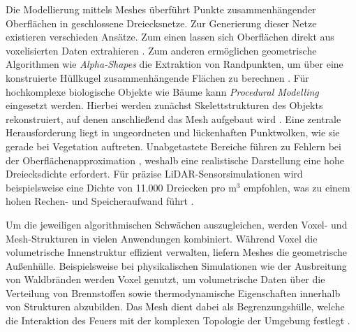 Die Modellierung mittels Meshes überführt Punkte zusammenhängender Oberflächen in geschlossene Dreiecksnetze. Zur Generierung dieser Netze existieren verschieden Ansätze. Zum einen lassen sich Oberflächen direkt aus voxelisierten Daten extrahieren \cite{chengRealTimeLiDARInertial2024}. Zum anderen ermöglichen geometrische Algorithmen wie \textit{Alpha-Shapes} die Extraktion von Randpunkten, um über eine konstruierte Hüllkugel zusammenhängende Flächen zu berechnen \cite{wangAutomatedPhenotypicTrait2024}. Für hochkomplexe biologische Objekte wie Bäume kann \textit{Procedural Modelling} eingesetzt werden. Hierbei werden zunächst Skelettstrukturen des Objekts rekonstruiert, auf denen anschließend das Mesh aufgebaut wird \cite{keerthinathanModellingLiDARBasedVegetation2025}. Eine zentrale Herausforderung liegt in ungeordneten und lückenhaften Punktwolken, wie sie gerade bei Vegetation auftreten. Unabgetastete Bereiche führen zu Fehlern bei der Oberflächenapproximation \cite{chengRealTimeLiDARInertial2024}, weshalb eine realistische Darstellung eine hohe Dreiecksdichte erfordert. Für präzise LiDAR-Sensorsimulationen wird beispielsweise eine Dichte von 11.000 Dreiecken pro $\text{m}^3$ empfohlen, was zu einem hohen Rechen- und Speicheraufwand führt \cite{goodinGeometricFidelityRequirements2024}.

Um die jeweiligen algorithmischen Schwächen auszugleichen, werden Voxel- und Mesh-Strukturen in vielen Anwendungen kombiniert. Während Voxel die volumetrische Innenstruktur effizient verwalten, liefern Meshes die geometrische Außenhülle. Beispielsweise bei physikalischen Simulationen wie der Ausbreitung von Waldbränden werden Voxel genutzt, um volumetrische Daten über die Verteilung von Brennstoffen sowie thermodynamische Eigenschaften innerhalb von Strukturen abzubilden. Das Mesh dient dabei als Begrenzungshülle, welche die Interaktion des Feuers mit der komplexen Topologie der Umgebung festlegt \cite{goodinGeometricFidelityRequirements2024}.